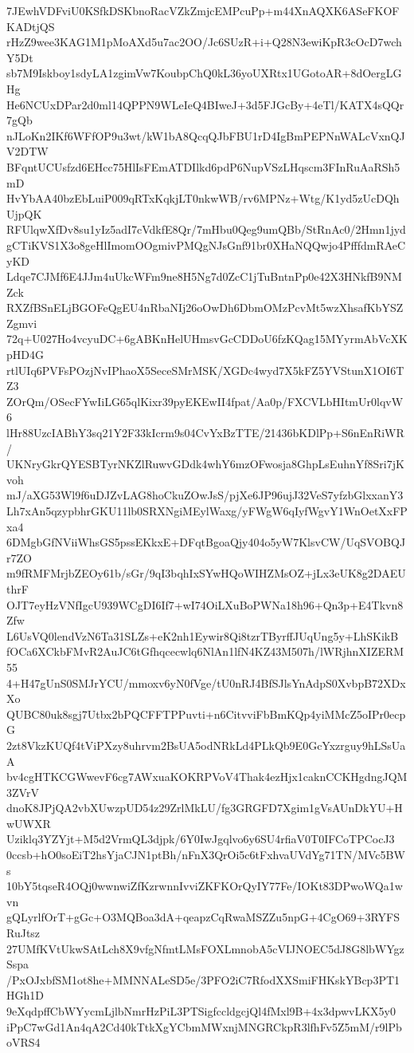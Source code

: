 7JEwhVDFviU0KSfkDSKbnoRacVZkZmjcEMPcuPp+m44XnAQXK6ASeFKOFKADtjQS
rHzZ9wee3KAG1M1pMoAXd5u7ac2OO/Jc6SUzR+i+Q28N3ewiKpR3cOcD7wchY5Dt
sb7M9Iskboy1sdyLA1zgimVw7KoubpChQ0kL36yoUXRtx1UGotoAR+8dOergLGHg
He6NCUxDPar2d0ml14QPPN9WLeIeQ4BIweJ+3d5FJGcBy+4eTl/KATX4sQQr7gQb
nJLoKn2IKf6WFfOP9u3wt/kW1bA8QcqQJbFBU1rD4IgBmPEPNnWALcVxnQJV2DTW
BFqntUCUsfzd6EHcc75HlIsFEmATDIlkd6pdP6NupVSzLHqscm3FInRuAaRSh5mD
HvYbAA40bzEbLuiP009qRTxKqkjLT0nkwWB/rv6MPNz+Wtg/K1yd5zUcDQhUjpQK
RFUlqwXfDv8su1yIz5adI7cVdkfE8Qr/7mHbu0Qeg9umQBb/StRnAc0/2Hmn1jyd
gCTiKVS1X3o8geHlImomOOgmivPMQgNJsGnf91br0XHaNQQwjo4PfffdmRAeCyKD
Ldqe7CJMf6E4JJm4uUkcWFm9ne8H5Ng7d0ZcC1jTuBntnPp0e42X3HNkfB9NMZck
RXZfBSnELjBGOFeQgEU4nRbaNIj26oOwDh6DbmOMzPcvMt5wzXhsafKbYSZZgmvi
72q+U027Ho4vcyuDC+6gABKnHelUHmsvGcCDDoU6fzKQag15MYyrmAbVcXKpHD4G
rtlUIq6PVFsPOzjNvIPhaoX5SeceSMrMSK/XGDc4wyd7X5kFZ5YVStunX1OI6TZ3
ZOrQm/OSecFYwIiLG65qlKixr39pyEKEwII4fpat/Aa0p/FXCVLbHItmUr0lqvW6
lHr88UzcIABhY3sq21Y2F33kIcrm9s04CvYxBzTTE/21436bKDlPp+S6nEnRiWR/
UKNryGkrQYESBTyrNKZlRuwvGDdk4whY6mzOFwosja8GhpLsEuhnYf8Sri7jKvoh
mJ/aXG53Wl9f6uDJZvLAG8hoCkuZOwJsS/pjXe6JP96ujJ32VeS7yfzbGlxxanY3
Lh7xAn5qzypbhrGKU11lb0SRXNgiMEylWaxg/yFWgW6qIyfWgvY1WnOetXxFPxa4
6DMgbGfNViiWhsGS5pssEKkxE+DFqtBgoaQjy404o5yW7KlsvCW/UqSVOBQJr7ZO
m9fRMFMrjbZEOy61b/sGr/9qI3bqhIxSYwHQoWIHZMsOZ+jLx3eUK8g2DAEUthrF
OJT7eyHzVNfIgcU939WCgDI6If7+wI74OiLXuBoPWNa18h96+Qn3p+E4Tkvn8Zfw
L6UsVQ0lendVzN6Ta31SLZs+eK2nh1Eywir8Qi8tzrTByrffJUqUng5y+LhSKikB
fOCa6XCkbFMvR2AuJC6tGfhqcecwlq6NlAn1lfN4KZ43M507h/lWRjhnXIZERM55
4+H47gUnS0SMJrYCU/mmoxv6yN0fVge/tU0nRJ4BfSJlsYnAdpS0XvbpB72XDxXo
QUBC80uk8sgj7Utbx2bPQCFFTPPuvti+n6CitvviFbBmKQp4yiMMcZ5oIPr0ecpG
2zt8VkzKUQf4tViPXzy8uhrvm2BsUA5odNRkLd4PLkQb9E0GcYxzrguy9hLSsUaA
bv4cgHTKCGWwevF6cg7AWxuaKOKRPVoV4Thak4ezHjx1caknCCKHgdngJQM3ZVrV
dnoK8JPjQA2vbXUwzpUD54z29ZrlMkLU/fg3GRGFD7Xgim1gVsAUnDkYU+HwUWXR
Uziklq3YZYjt+M5d2VrmQL3djpk/6Y0IwJgqlvo6y6SU4rfiaV0T0IFCoTPCocJ3
0ccsb+hO0soEiT2hsYjaCJN1ptBh/nFnX3QrOi5c6tFxhvaUVdYg71TN/MVc5BWs
10bY5tqseR4OQj0wwnwiZfKzrwnnIvviZKFKOrQyIY77Fe/IOKt83DPwoWQa1wvn
gQLyrlfOrT+gGc+O3MQBoa3dA+qeapzCqRwaMSZZu5npG+4CgO69+3RYFSRuJtsz
27UMfKVtUkwSAtLch8X9vfgNfmtLMsFOXLmnobA5cVIJNOEC5dJ8G8lbWYgzSspa
/PxOJxbfSM1ot8he+MMNNALeSD5e/3PFO2iC7RfodXXSmiFHKskYBcp3PT1HGh1D
9eXqdpffCbWYycmLjlbNmrHzPiL3PTSigfccldgcjQl4fMxl9B+4x3dpwvLKX5y0
iPpC7wGd1An4qA2Cd40kTtkXgYCbmMWxnjMNGRCkpR3lfhFv5Z5mM/r9lPboVRS4

